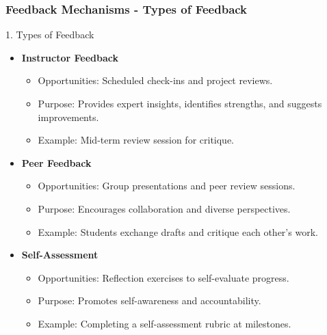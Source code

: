 \documentclass[aspectratio=169]{beamer}
\begin{document}
\begin{frame}[fragile]
  \frametitle{Feedback Mechanisms - Types of Feedback}
  \begin{block}{1. Types of Feedback}
    \begin{itemize}
      \item \textbf{Instructor Feedback}
        \begin{itemize}
          \item Opportunities: Scheduled check-ins and project reviews.
          \item Purpose: Provides expert insights, identifies strengths, and suggests improvements.
          \item Example: Mid-term review session for critique.
        \end{itemize}
      \item \textbf{Peer Feedback}
        \begin{itemize}
          \item Opportunities: Group presentations and peer review sessions.
          \item Purpose: Encourages collaboration and diverse perspectives.
          \item Example: Students exchange drafts and critique each other’s work.
        \end{itemize}
      \item \textbf{Self-Assessment}
        \begin{itemize}
          \item Opportunities: Reflection exercises to self-evaluate progress.
          \item Purpose: Promotes self-awareness and accountability.
          \item Example: Completing a self-assessment rubric at milestones.
        \end{itemize}
    \end{itemize}
  \end{block}
\end{frame}
\end{document}
